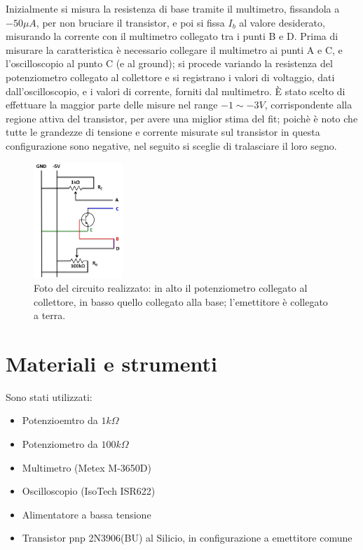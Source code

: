 \documentclass{article}
\begin{document}
Inizialmente si misura la resistenza di base tramite il multimetro, fissandola a $-50 \mu A$, per non bruciare il transistor, e poi si fissa $I_b$ al valore desiderato, misurando la corrente con il multimetro collegato tra i punti B e D.
Prima di misurare la caratteristica è necessario collegare il multimetro ai punti A e C, e l'oscilloscopio al punto C (e al ground); si procede variando la resistenza del potenziometro collegato al collettore e si registrano i valori di voltaggio, dati dall'oscilloscopio, e i valori di corrente, forniti dal multimetro.
È stato scelto di effettuare la maggior parte delle misure nel range $-1 \sim -3 V$, corrispondente alla regione attiva del transistor, per avere una miglior stima del fit; poichè è noto che tutte le grandezze di tensione e corrente misurate sul transistor in questa configurazione sono negative, nel seguito si sceglie di tralasciare il loro segno.
\begin{figure}[H]
    \centering
    \includegraphics[width=0.3\textwidth]{circuito.jpg}
    \caption{\label{fig:circuito}\centering Foto del circuito realizzato: in alto il potenziometro collegato al collettore, in basso quello collegato alla base; l'emettitore è collegato a terra.}
\end{figure}
\newpage
\section{Materiali e strumenti}
Sono stati utilizzati:
\begin{itemize}
    \item Potenzioemtro da $1 k\Omega$
    \item Potenziometro da $100 k\Omega$
    \item Multimetro (Metex M-3650D)
    \item Oscilloscopio (IsoTech ISR622)
    \item Alimentatore a bassa tensione
    \item Transistor pnp 2N3906(BU) al Silicio, in configurazione a emettitore comune
\end{itemize}
\end{document}

